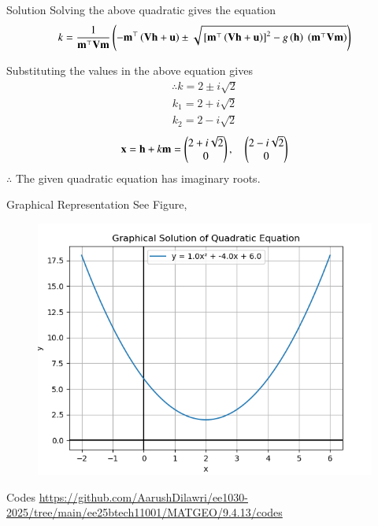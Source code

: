 \documentclass{beamer}
\begin{document}
\begin{frame}{Solution}
    Solving the above quadratic gives the equation
\begin{align}
k = \frac{1}{\mathbf{m}^{\top}\mathbf{V}\mathbf{m}}
\left(
    -\mathbf{m}^{\top} \left(\mathbf{V}\mathbf{h} + \mathbf{u}\right)
    \pm
    \sqrt{ {}\left[\mathbf{m}^{\top}\left(\mathbf{V}\mathbf{h} + \mathbf{u}\right)\right]^2
    - g\left(\mathbf{h}\right) \ \left(\mathbf{m}^{\top}\mathbf{V}\mathbf{m}\right) }
    \right)
\end{align}

Substituting the values in the above equation gives
\begin{align}
\therefore k =2 \pm i\sqrt{2}
\end{align}
\begin{align}
 k_1 = 2 + i\sqrt{2}\\
 k_2 = 2 - i\sqrt{2}
\end{align}
\begin{align}
    \mathbf{x} = \mathbf{h} + k\mathbf{m}
   = \begin{pmatrix}2 + i\sqrt{2} \\ 0\end{pmatrix},\quad
     \begin{pmatrix}2 - i\sqrt{2} \\ 0\end{pmatrix}
\end{align}
$\therefore$ The given quadratic equation has imaginary roots.
\end{frame}
\begin{frame}{Graphical Representation}
See Figure,
\begin{figure}[h!]
    \centering
    \includegraphics[height=0.5\textheight, keepaspectratio]{figs/fig.png}
    \label{figure_1}
\end{figure}
\end{frame}
\begin{frame}[fragile]{Codes}
\url{https://github.com/AarushDilawri/ee1030-2025/tree/main/ee25btech11001/MATGEO/9.4.13/codes}
\end{frame}
\end{document}

